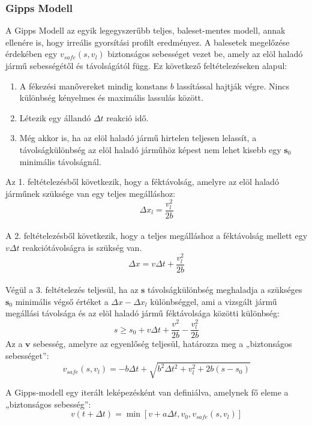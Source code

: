\documentclass[14pt,a4paper]{extarticle}
\begin{document}
\subsubsection{Gipps Modell}
A Gipps Modell az egyik legegyszerűbb teljes, baleset-mentes modell, annak ellenére is, hogy irreális gyorsítási profilt eredményez.
A balesetek megelőzése érdekében egy $v_{safe}(s,v_l)$ biztonságos sebességet vezet be, amely az elöl haladó jármű sebességétől és távolságától függ. Ez következő feltételezéseken alapul:
	\begin{enumerate}
	\item A fékezési manővereket mindig konstans $b$ lassítással hajtják végre. Nincs különbség kényelmes és maximális lassulás között.
	\item Létezik egy állandó $\Delta t$ reakció idő.
	\item Még akkor is, ha az elöl haladó jármű hirtelen teljesen lelassít, a távolságkülönbség az elöl haladó járműhöz képest nem lehet kisebb egy $\mathbf{s}_0$ minimális távolságnál.
	\end{enumerate}
Az 1. feltételezésből következik, hogy a féktávolság, amelyre az elöl haladó járműnek szüksége van egy teljes megálláshoz:
\[ \Delta x_l = \frac{v_l^2}{2b}\]
\\
A 2. feltételezésből következik, hogy a teljes megálláshoz a féktávolság mellett egy $v\Delta t$ reakciótávolságra is szükség van.
\[ \Delta x = v\Delta t + \frac{v_l^2}{2b}\]
\\
Végül a 3. feltételezés teljesül, ha az $\mathbf{s}$ távolságkülönbség meghaladja a szükséges $\mathbf{s}_0$ minimális végső értéket a $\Delta x - \Delta x_l$ különbséggel, ami a vizsgált jármű megállási távolsága és az elöl haladó jármű féktávolsága közötti különbség:
$$s \ge s_0 + v\Delta t + \frac{v^2}{2b} - \frac{v_l^2}{2b}$$
Az a $\mathbf{v}$ sebesség, amelyre az egyenlőség teljesül, határozza meg a „biztonságos sebességet”:$$v_{safe}(s, v_l) = -b\Delta t + \sqrt{b^2\Delta t^2 + v_l^2 + 2b(s - s_0)}$$

A Gipps-modell egy iterált leképezésként van definiálva, amelynek fő eleme a „biztonságos sebesség”:
$$v(t + \Delta t) = \min [v + a\Delta t, v_0, v_{safe}(s, v_l)]$$
\end{document}
